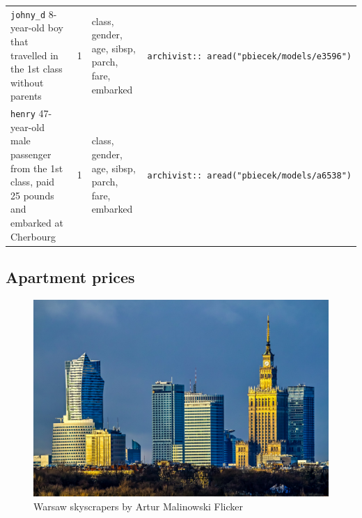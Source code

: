 \documentclass[12pt,]{krantz}
\theoremstyle{definition}
\theoremstyle{definition}
\theoremstyle{definition}
\theoremstyle{remark}
\begin{document}
\begin{longtable}[]{@{}llll@{}}
\begin{minipage}[t]{0.22\columnwidth}
\texttt{johny\_d} 8-year-old boy that travelled in the 1st class without
parents\strut
\end{minipage} & \begin{minipage}[t]{0.16\columnwidth}\raggedright
1\strut
\end{minipage} & \begin{minipage}[t]{0.19\columnwidth}\raggedright
class, gender, age, sibsp, parch, fare, embarked\strut
\end{minipage} & \begin{minipage}[t]{0.33\columnwidth}\raggedright
\texttt{archivist::\ aread("pbiecek/models/e3596")}\strut
\end{minipage}\tabularnewline
\begin{minipage}[t]{0.22\columnwidth}\raggedright
\texttt{henry} 47-year-old male passenger from the 1st class, paid 25
pounds and embarked at Cherbourg\strut
\end{minipage} & \begin{minipage}[t]{0.16\columnwidth}\raggedright
1\strut
\end{minipage} & \begin{minipage}[t]{0.19\columnwidth}\raggedright
class, gender, age, sibsp, parch, fare, embarked\strut
\end{minipage} & \begin{minipage}[t]{0.33\columnwidth}\raggedright
\texttt{archivist::\ aread("pbiecek/models/a6538")}\strut
\end{minipage}\tabularnewline
\bottomrule
\end{longtable}

\hypertarget{ApartmentDataset}{%
\subsection{Apartment prices}\label{ApartmentDataset}}

\begin{figure}
\centering
\includegraphics{figure/am1974_flicker.jpg}
\caption{Warsaw skyscrapers by Artur Malinowski Flicker}
\end{figure}
\end{document}
